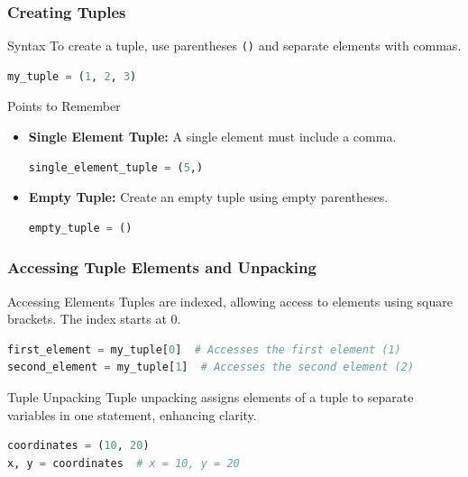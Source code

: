 \documentclass{beamer}
\begin{document}
\begin{frame}[fragile]
    \frametitle{Creating Tuples}
    \begin{block}{Syntax}
        To create a tuple, use parentheses \texttt{()} and separate elements with commas.
        \begin{lstlisting}[language=Python]
my_tuple = (1, 2, 3)
        \end{lstlisting}
    \end{block}
    
    \begin{block}{Points to Remember}
        \begin{itemize}
            \item \textbf{Single Element Tuple:} A single element must include a comma.
                \begin{lstlisting}[language=Python]
single_element_tuple = (5,)
                \end{lstlisting}
            \item \textbf{Empty Tuple:} Create an empty tuple using empty parentheses.
                \begin{lstlisting}[language=Python]
empty_tuple = ()
                \end{lstlisting}
        \end{itemize}
    \end{block}
\end{frame}

\begin{frame}[fragile]
    \frametitle{Accessing Tuple Elements and Unpacking}
    \begin{block}{Accessing Elements}
        Tuples are indexed, allowing access to elements using square brackets. The index starts at 0.
        \begin{lstlisting}[language=Python]
first_element = my_tuple[0]  # Accesses the first element (1)
second_element = my_tuple[1]  # Accesses the second element (2)
        \end{lstlisting}
    \end{block}
    
    \begin{block}{Tuple Unpacking}
        Tuple unpacking assigns elements of a tuple to separate variables in one statement, enhancing clarity.
        \begin{lstlisting}[language=Python]
coordinates = (10, 20)
x, y = coordinates  # x = 10, y = 20
        \end{lstlisting}
    \end{block}
\end{frame}
\end{document}
